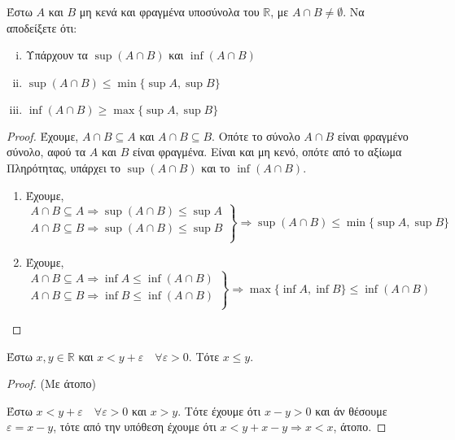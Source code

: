 \begin{mybox3}
\begin{prop}
  Έστω $A$ και $B$ μη κενά και φραγμένα υποσύνολα του $ \mathbb{R} $, με 
  $ A \cap B \neq \emptyset $. Να αποδείξετε ότι:
  \begin{enumerate}[i)]
    \item Υπάρχουν τα $ \sup {(A \cap B)} $ και $ \inf {(A \cap B)} $
    \item $ \sup {(A \cap B)} \leq \min \{ \sup A, \sup B \} $
    \item $ \inf {(A \cap B)} \geq \max \{ \sup A, \sup B \} $
  \end{enumerate}
\end{prop}
\end{mybox3}
\begin{proof}
\item Έχουμε, $ A \cap B \subseteq A $ και $ A \cap B \subseteq B $. 
  Οπότε το σύνολο $ A \cap B $ είναι φραγμένο σύνολο, αφού τα $ A $ και $B$ 
  είναι φραγμένα. Είναι και μη κενό, οπότε από το αξίωμα Πληρότητας, 
  υπάρχει το $ \sup {(A \cap B)} $ και το $ \inf {(A \cap B)} $.
  \begin{enumerate}[label=\roman*),labelindent=0em,leftmargin=*]
    \item Έχουμε, 
      \[
        \left.
          \begin{matrix}
            A \cap B \subseteq A\! \Rightarrow\!\sup (A \cap B) \leq \sup A \\
            A \cap B \subseteq B\! \Rightarrow\!\sup (A \cap B) \leq \sup B \\
          \end{matrix} 
          \right\} \!\!\Rightarrow\!\sup {(A \cap B)}\!\leq\!\min \{ \sup\!A,
        \sup\!B \} 
      \]
    \item Έχουμε, 
      \[
        \left.
          \begin{matrix}
            A \cap B \subseteq A \Rightarrow \inf A \leq \inf (A \cap B) \\
            A \cap B \subseteq B \Rightarrow \inf B \leq \inf (A \cap B) \\
          \end{matrix} 
        \right\}\! \Rightarrow \max \{ \inf A, \inf B \} \leq \inf {(A \cap B)}
      \]
  \end{enumerate}
\end{proof}

\begin{lem}
  \label{lem:vare2}
  Έστω $ x,y \in \mathbb{R} $ και $ x<y+ \varepsilon \quad \forall \varepsilon >0 $. 
  Τότε $ x \leq y $.
\end{lem}
\begin{proof}(Με άτοπο)
\item {}
  Έστω $ x < y+ \varepsilon \quad \forall \varepsilon >0 $ και $ x>y $. Τότε 
  έχουμε ότι $ x-y>0 $ και άν θέσουμε  $ \varepsilon = x-y $, τότε από την 
  υπόθεση έχουμε ότι $ x< y+ x-y \Rightarrow x<x $, άτοπο.
\end{proof}


